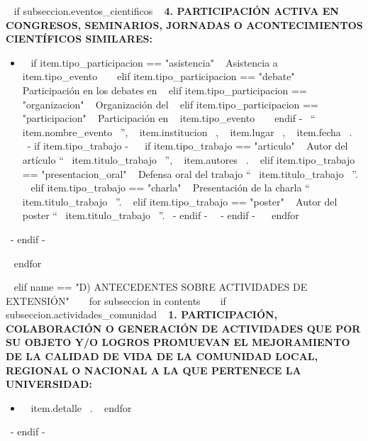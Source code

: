     ~{ if subseccion.eventos_cientificos }~
      \textbf{4. PARTICIPACIÓN ACTIVA EN CONGRESOS, SEMINARIOS, JORNADAS O ACONTECIMIENTOS CIENTÍFICOS SIMILARES:}
      \begin{itemize}
      ~{ for item in subseccion.eventos_cientificos }~
        \item ~{ if item.tipo_participacion == "asistencia" }~ Asistencia a ~{{ item.tipo_evento }}~
              ~{ elif item.tipo_participacion == "debate" }~ Participación en los debates en
              ~{ elif item.tipo_participacion == "organizacion" }~ Organización del
              ~{ elif item.tipo_participacion == "participacion" }~ Participación en ~{{ item.tipo_evento }}~ ~{ endif -}~
              ``~{{ item.nombre_evento }}~'', ~{{ item.institucion }}~, ~{{ item.lugar }}~, ~{{ item.fecha }}~.
              ~{- if item.tipo_trabajo -}~
                ~{ if item.tipo_trabajo == "articulo" }~ Autor del artículo ``~{{ item.titulo_trabajo }}~'', ~{{ item.autores }}~.
                ~{ elif item.tipo_trabajo == "presentacion_oral" }~ Defensa oral del trabajo ``~{{ item.titulo_trabajo }}~''.
                ~{ elif item.tipo_trabajo == "charla" }~ Presentación de la charla ``~{{ item.titulo_trabajo }}~''.
                ~{ elif item.tipo_trabajo == "poster" }~ Autor del poster ``~{{ item.titulo_trabajo }}~''. ~{- endif -}~
              ~{- endif -}~
        \espacioEntreItems{}
      ~{ endfor }~
      \end{itemize}
      \espacioEntreSubSecciones{}
    ~{- endif -}~

  ~{ endfor }~
  \espacioEntreSecciones{}


~{ elif name == "D) ANTECEDENTES SOBRE ACTIVIDADES DE EXTENSIÓN" }~
  ~{ for subseccion in contents }~
    ~{ if subseccion.actividades_comunidad }~
      \textbf{1. PARTICIPACIÓN, COLABORACIÓN O GENERACIÓN DE ACTIVIDADES QUE POR SU OBJETO Y/O LOGROS PROMUEVAN EL MEJORAMIENTO DE LA CALIDAD DE VIDA DE LA  COMUNIDAD LOCAL, REGIONAL O NACIONAL A LA QUE PERTENECE LA UNIVERSIDAD:}
      \begin{itemize}
      ~{ for item in subseccion.actividades_comunidad }~
        \item ~{{ item.detalle }}~.
        \espacioEntreItems{}
      ~{ endfor }~
      \end{itemize}
      \espacioEntreSubSecciones{}
    ~{- endif -}~

